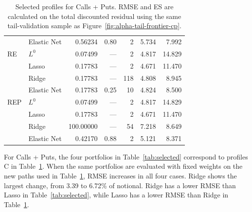 \documentclass[12pt,a4paper]{article}
\newcommand{\1}{\mathbf{1}}
\begin{document}
\begin{minipage}{\linewidth}
\begin{table}[H]
\begin{tabular}{llrrrrr}
 & Elastic Net & 0.56234 & 0.80 & 2 & 5.734 & 7.992 \\
\addlinespace[2pt]
RE & $L^0$ & 0.07499 & --- & 2 & 4.817 & 14.829 \\
 & Lasso & 0.17783 & --- & 2 & 4.671 & 11.470 \\
 & Ridge & 0.17783 & --- & 118 & 4.808 & 8.945 \\
 & Elastic Net & 0.17783 & 0.25 & 10 & 4.824 & 8.500 \\
\addlinespace[2pt]
REP & $L^0$ & 0.07499 & --- & 2 & 4.817 & 14.829 \\
 & Lasso & 0.17783 & --- & 2 & 4.671 & 11.470 \\
 & Ridge & 100.00000 & --- & 54 & 7.218 & 8.649 \\
 & Elastic Net & 0.42170 & 0.88 & 2 & 5.121 & 8.371 \\
\bottomrule
\end{tabular}
\caption{Selected profiles for Calls + Puts. RMSE and ES are calculated on the total discounted residual using the same tail-validation sample as Figure~\ref{fig:alpha-tail-frontier-cp}.}
\label{tab:tail-profiles-cp}
\end{table}
\end{minipage}\par


For Calls + Puts, the four portfolios in Table~\ref{tab:selected} correspond to profiles C in Table~\ref{tab:tail-profiles-cp}. When the same portfolios are evaluated with fixed weights on the new paths used in Table~\ref{tab:tail-profiles-cp}, RMSE increases in all four cases. Ridge shows the largest change, from 3.39 to 6.72\% of notional. Ridge has a lower RMSE than Lasso in Table~\ref{tab:selected}, while Lasso has a lower RMSE than Ridge in Table~\ref{tab:tail-profiles-cp}.
\end{document}
